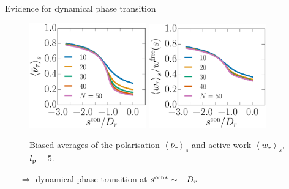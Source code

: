 \documentclass{beamer}
\begin{document}
\begin{frame}{Evidence for dynamical phase transition}

\vspace{-5pt}
\begin{figure}
\centering
\includegraphics[width=0.45\textwidth]{sOrder_Dk6500_Ll5000_To1000-con.eps}
\includegraphics[width=0.45\textwidth]{sWork_Dk6500_Ll5000_To1000-con.eps}
\vspace{-5pt}
\caption{Biased averages of the polarisation $\left<\bar{\nu}_{\tau}\right>_s$ and active work $\left<w_{\tau}\right>_s$, $\tilde{l}_{\rm p} = 5$. }
\end{figure}

\begin{itemize}
  \item[$\Rightarrow$] dynamical phase transition at $s^{{\rm con}*} \sim - D_r$
\end{itemize}

\end{frame}
\end{document}
